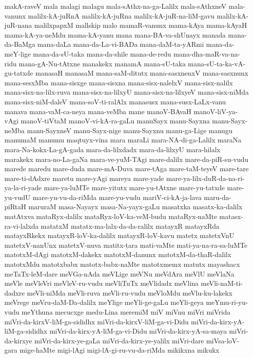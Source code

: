 {makA-raveV
mala
malagi
malagu
mala-sAthx-na-ga-Lalilx
mala-sAthxneV
mala-vanunx
malilx-kA-juRnA
malilx-kA-juRna
malilx-kA-juR-na-liM-gavu
malilx-kA-juR-nana
malilxpapxM
mallskip
malo
mamaR-vanunx
mama-kAya
mama-kAyaH
mama-kA-ya-neMdu
mama-kA-yanu
mana
mana-BA-va-shUnayx
manada
mana-da-BaMga
mana-daLa
mana-da-La-vi-BADa
mana-daM-ta-yARmi
mana-da-meY-lige
mana-da-sU-taka
mana-da-shile
mana-de-redu
mana-dha-maR-va-na-ridu
mana-gA-Nu-tAtxne
manakekx
manamA
mana-sU-taka
mana-sU-ta-ka-vA-gu-tatxde
manasaH
manasaM
mana-saM-ditutx
mana-sasxnenxV
mana-sasxnunx
mana-sesxMba
mana-sisxge
mana-sisxna
mana-sisx-nalelxV
mana-sisx-nalilx
mana-sisx-na-lilx-ruva
mana-sisx-na-lilxyU
mana-sisx-na-lilxyeV
mana-sisx-niMda
mana-sisx-niM-daleV
mana-soV-ti-ralAlx
manasusx
mana-susx-LaLx-vanu
manava
mana-vaM-ca-neya
mana-veMba
mane
manoV-BAvaH
manoV-liV-ya-vAgi
manoV-tiVtaM
manoV-vi-kA-ra-gaLu
manuSayx
manu-Sayxna
manu-Sayx-neMba
manu-SayxneV
manu-Sayx-nige
manu-Sayxnu
manu-ga-Lige
manugu
manumaM
manumu
maqtuyx-vina
mara
maraLi
mara-NA-di-ga-Lalilx
maraNa
mara-Na-kokx-La-gA-gada
mara-da-lilxdadx
mara-da-lilxyU
mara-hilalx
marakekx
mara-no-La-gaNa
mara-ve-yuM-TAgi
mare-dalilx
mare-da-piR-su-vudu
marede
maredu
mare-duda
mare-mA-Duva
mare-tAga
mare-taM-teyeV
mare-tare
mare-ti-dAdxre
maretu
mare-yAgi
mareya
mare-yade
mare-ya-lilx-duR-da-na-ri-ya-la-ri-yade
mare-ya-luMTe
mare-yitutx
mare-yu-tAtxne
mare-yu-tatxde
mare-yu-vudU
mare-yu-vu-da-riMda
mare-yu-vudu
mariV-ci-kA-ja-lava
maru-da-piRtaH
maruraM
masa-Nayayx
masa-Na-yayx-gaLu
masatxka
masatx-ka-dalilx
matAtxva
mataRyx-dalilx
mataRyx-loV-ka-veM-budu
mataRyx-naMte
matasx-ra-vi-lalxda
matatxM
matatx-ma-lalx-da-da-ralilx
matayxR
matayxRda
matayxRkekx
matayxR-loV-ka-dalilx
matayxR-loV-kavu
matetx
matetxVnU
matetxV-nanUnx
matetxV-nuva
matitx-tara
mati-vaMte
mati-ya-na-ra-sa-luMTe
matotxM-dAgi
matotxM-dakekx
matotxM-danunx
matotxM-da-thaR-dalilx
matotxMdu
matotxbabx
matotx-babx-naMte
matotxmemx
matutx
mayashacx
meTaTx-leM-dare
meVGa-nAda
meVLige
meVNu
meVdAra
meVlU
meVlaNa
meVle
meVleVri
meVleV-ru-vudu
meVliTuTx
meVlidadx
meVlina
meVli-naM-ti-dadxre
meVli-niMda
meVli-ruva
meVli-ru-vudu
meVloMdu
meVlu-ku-lakekx
meVrege
meVru-daM-Da-dalilx
meYlige
meYli-ge-gaLu
meYli-geya
meYmu-ri-yu-vudu
meYthuna
mecucxge
medu-Lina
meremiM
miV
miVnu
miVri
miVrida
miVri-da-kirxV-liM-ga-sididhx
miVri-da-kirxV-liM-ga-vi-Didu
miVri-da-kirx-yA-liM-ga-sididhx
miVri-da-kirx-yA-liM-ga-vi-Didu
miVri-da-kirx-yA-sa-maya
miVri-da-kirxye
miVri-da-kirx-ye-gaLa
miVri-da-kirx-ye-yalilx
miVri-dare
miVsa-loV-gara
mige-haMte
migi-lAgi
migi-lA-gi-ru-vu-da-riMda
mikikxna
mikukx
}
